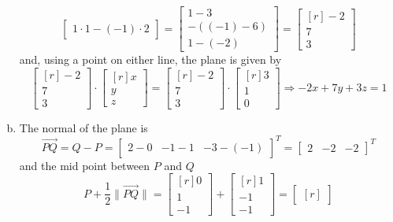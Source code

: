 \documentclass[../main.tex]{subfiles}
\begin{document}
\begin{enumerate}[a)]
\[\begin{bmatrix}
				1\cdot1 - (-1)\cdot2
			\end{bmatrix}
			=
			\begin{bmatrix}
				1 - 3 \\
				-((-1) - 6) \\
				1 - (-2)
			\end{bmatrix}
			=
			\begin{bmatrix*}[r]-2\\7\\3\end{bmatrix*}
		\]
		and, using a point on either line, the plane is given by
	\setcounter{enumi}{9}
		\[
			\begin{bmatrix*}[r]
				-2 \\
				7 \\
				3
			\end{bmatrix*}
			\cdot
			\begin{bmatrix*}[r]
				x \\
				y \\
				z
			\end{bmatrix*}
			=
			\begin{bmatrix*}[r]
				-2 \\
				7 \\
				3
			\end{bmatrix*}
			\cdot
			\begin{bmatrix*}[r]
				3 \\
				1 \\
				0
			\end{bmatrix*}
			\Rightarrow
			-2x + 7y + 3z = 1
		\]
	\item 
		The normal of the plane is
		\[
			\overrightarrow{PQ}
			=
			Q - P
			=
			\begin{bmatrix}
				2 - 0 & -1 - 1 & -3 - (-1)
			\end{bmatrix}^T
			=
			\begin{bmatrix}
				2 & -2 & -2
			\end{bmatrix}^T
		\]
		and the mid point between $P$ and $Q$
		\[
			P + \frac{1}{2}\|\overrightarrow{PQ}\|
			=
			\begin{bmatrix*}[r]
				0 \\
				1 \\
				-1
			\end{bmatrix*}
			+
			\begin{bmatrix*}[r]
				1 \\
				-1 \\
				-1
			\end{bmatrix*}
			=
			\begin{bmatrix*}[r]

\end{bmatrix*}\]
\end{enumerate}
\end{document}
